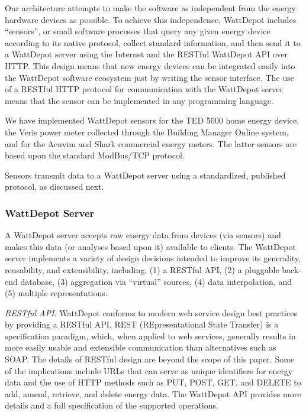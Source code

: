 Our architecture attempts to make the software as independent from
the energy hardware devices as possible.  To achieve this independence,
WattDepot includes ``sensors'', or small software processes
that query any given energy device according to its native protocol,
collect standard information, and then send it to a WattDepot server using
the Internet and the RESTful WattDepot API over HTTP.  This design means
that new energy devices can be integrated easily into the WattDepot
software ecosystem just by writing the sensor interface.  The use of a
RESTful HTTP protocol for communication with the WattDepot server means
that the sensor can be implemented in any programming language.

We have implemented WattDepot sensors for the TED 5000 home energy device, 
the Veris power meter collected through the Building Manager Online system,
and for the Acuvim and Shark commercial energy meters. The latter sensors
are based upon the standard ModBus/TCP protocol. 

Sensors transmit data to a WattDepot server using a standardized, published
protocol, as discussed next.

\subsubsection{WattDepot Server}

A WattDepot server accepts raw energy data from devices (via sensors) and
makes this data (or analyses based upon it) available to clients.  The
WattDepot server implements a variety of design decisions intended to
improve its generality, reusability, and extensibility, including: (1) a
RESTful API, (2) a pluggable back-end database, (3) aggregation via
``virtual'' sources, (4) data interpolation, and (5) multiple
representations.

{\em RESTful API.} WattDepot conforms to modern web service design best
practices by providing a RESTful API.  REST (REpresentational State
Transfer) \cite{REST} is a specification paradigm, which, when applied to
web services, generally results in more easily usable and extensible
communication than alternatives such as SOAP. The details of RESTful design
are beyond the scope of this paper. Some of the implications include
URLs that can serve as unique identifiers for energy data and the use of HTTP
methods such as PUT, POST, GET, and DELETE to add, amend, retrieve, and
delete energy data. The WattDepot API \cite{WattDepotAPI} provides more
details and a full specification of the supported operations.

